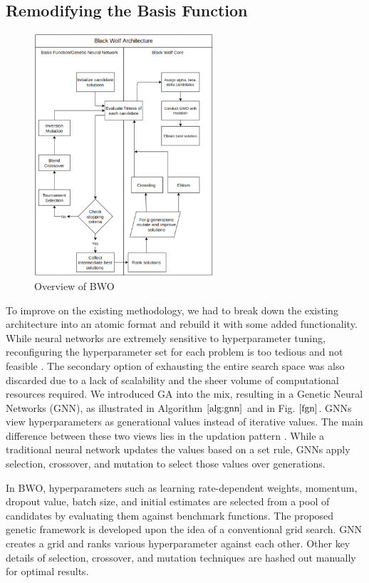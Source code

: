 \documentclass[conference]{IEEEtran}
\theoremstyle{definition}
\begin{document}
\subsection{Remodifying the Basis Function}

\begin{figure}
\centering\includegraphics[height=9cm]{flow.png}
\caption{Overview of BWO}
\label{flow}
\end{figure}
To improve on the existing methodology, we had to break down the existing architecture into an atomic format and rebuild it with some added functionality. While neural networks are extremely sensitive to hyperparameter tuning, reconfiguring the hyperparameter set for each problem is too tedious and not feasible \cite{mat}. The secondary option of exhausting the entire search space was also discarded due to a lack of scalability and the sheer volume of computational resources required. We introduced GA into the mix, resulting in a Genetic Neural Networks (GNN), as illustrated in Algorithm $\ref{alg:gnn}$ and in Fig. $\ref{fgn}$. GNNs view hyperparameters as generational values instead of iterative values. The main difference between these two views lies in the updation pattern \cite{gnn}. While a traditional neural network updates the values based on a set rule, GNNs apply selection, crossover, and mutation to select those values over generations. 

In BWO, hyperparameters such as learning rate-dependent weights, momentum, dropout value, batch size, and initial estimates are selected from a pool of candidates by evaluating them against benchmark functions. The proposed genetic framework is developed upon the idea of a conventional grid search. GNN creates a grid and ranks various hyperparameter against each other. Other key details of selection, crossover, and mutation techniques are hashed out manually for optimal results. 
\end{document}
